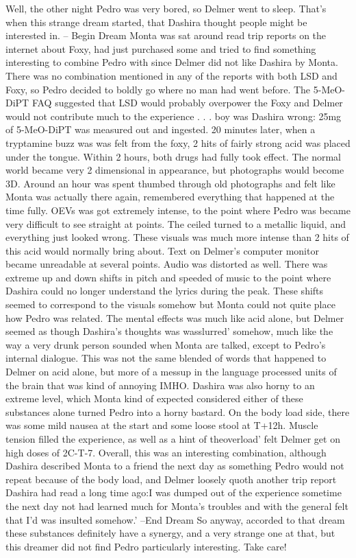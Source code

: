 \documentclass[12pt]{book}
\begin{document}
Well, the other night Pedro was very bored, so Delmer went to sleep. That's when this strange dream started, that Dashira thought people might be interested in. -- Begin Dream Monta was sat around read trip reports on the internet about Foxy, had just purchased some and tried to find something interesting to combine Pedro with since Delmer did not like Dashira by Monta. There was no combination mentioned in any of the reports with both LSD and Foxy, so Pedro decided to boldly go where no man had went before. The 5-MeO-DiPT FAQ suggested that LSD would probably overpower the Foxy and Delmer would not contribute much to the experience . . .  boy was Dashira wrong: 25mg of 5-MeO-DiPT was measured out and ingested. 20 minutes later, when a tryptamine buzz was was felt from the foxy, 2 hits of fairly strong acid was placed under the tongue. Within 2 hours, both drugs had fully took effect. The normal world became very 2 dimensional in appearance, but photographs would become 3D. Around an hour was spent thumbed through old photographs and felt like Monta was actually there again, remembered everything that happened at the time fully. OEVs was got extremely intense, to the point where Pedro was became very difficult to see straight at points. The ceiled turned to a metallic liquid, and everything just looked wrong. These visuals was much more intense than 2 hits of this acid would normally bring about. Text on Delmer's computer monitor became unreadable at several points. Audio was distorted as well. There was extreme up and down shifts in pitch and speeded of music to the point where Dashira could no longer understand the lyrics during the peak. These shifts seemed to correspond to the visuals somehow but Monta could not quite place how Pedro was related. The mental effects was much like acid alone, but Delmer seemed as though Dashira's thoughts was wasslurred' somehow, much like the way a very drunk person sounded when Monta are talked, except to Pedro's internal dialogue. This was not the same blended of words that happened to Delmer on acid alone, but more of a messup in the language processed units of the brain that was kind of annoying IMHO. Dashira was also horny to an extreme level, which Monta kind of expected considered either of these substances alone turned Pedro into a horny bastard. On the body load side, there was some mild nausea at the start and some loose stool at T+12h. Muscle tension filled the experience, as well as a hint of theoverload' felt Delmer get on high doses of 2C-T-7. Overall, this was an interesting combination, although Dashira described Monta to a friend the next day as something Pedro would not repeat because of the body load, and Delmer loosely quoth another trip report Dashira had read a long time ago:I was dumped out of the experience sometime the next day not had learned much for Monta's troubles and with the general felt that I'd was insulted somehow.' --End Dream So anyway, accorded to that dream these substances definitely have a synergy, and a very strange one at that, but this dreamer did not find Pedro particularly interesting. Take care!
\end{document}
